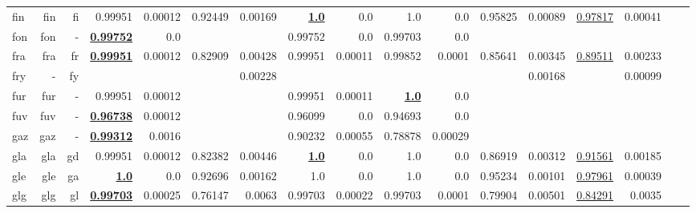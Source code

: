\documentclass[11pt]{article}
\begin{document}
\begin{table*}[h]
{\begin{tabular}{lrrrrrrrrrrrrrrrr}
fin         & fin         & fi         & 0.99951         & 0.00012         & 0.92449         & 0.00169         & \textbf{\underline{1.0}}         & 0.0         & 1.0         & 0.0         & 0.95825         & 0.00089         & \underline{0.97817}         & 0.00041         \\
fon         & fon         & -         & \textbf{\underline{0.99752}}         & 0.0         &          &          & 0.99752         & 0.0         & 0.99703         & 0.0         &          &          &          &          \\
fra         & fra         & fr         & \textbf{\underline{0.99951}}         & 0.00012         & 0.82909         & 0.00428         & 0.99951         & 0.00011         & 0.99852         & 0.0001         & 0.85641         & 0.00345         & \underline{0.89511}         & 0.00233         \\
fry         & -         & fy         &          &          &          & 0.00228         &          &          &          &          &          & 0.00168         &          & 0.00099         \\
fur         & fur         & -         & 0.99951         & 0.00012         &          &          & 0.99951         & 0.00011         & \textbf{\underline{1.0}}         & 0.0         &          &          &          &          \\
fuv         & fuv         & -         & \textbf{\underline{0.96738}}         & 0.00012         &          &          & 0.96099         & 0.0         & 0.94693         & 0.0         &          &          &          &          \\
gaz         & gaz         & -         & \textbf{\underline{0.99312}}         & 0.0016         &          &          & 0.90232         & 0.00055         & 0.78878         & 0.00029         &          &          &          &          \\
gla         & gla         & gd         & 0.99951         & 0.00012         & 0.82382         & 0.00446         & \textbf{\underline{1.0}}         & 0.0         & 1.0         & 0.0         & 0.86919         & 0.00312         & \underline{0.91561}         & 0.00185         \\
gle         & gle         & ga         & \textbf{\underline{1.0}}         & 0.0         & 0.92696         & 0.00162         & 1.0         & 0.0         & 1.0         & 0.0         & 0.95234         & 0.00101         & \underline{0.97961}         & 0.00039         \\
glg         & glg         & gl         & \textbf{\underline{0.99703}}         & 0.00025         & 0.76147         & 0.0063         & 0.99703         & 0.00022         & 0.99703         & 0.0001         & 0.79904         & 0.00501         & \underline{0.84291}         & 0.0035         \\

\end{tabular}}
\end{table*}
\end{document}
